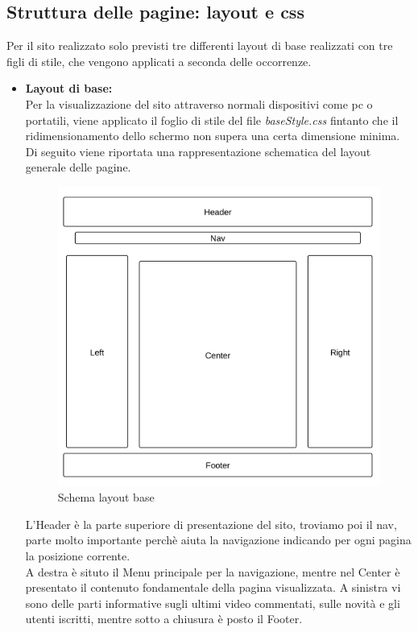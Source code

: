 \subsection{Struttura delle pagine: layout e css}
Per il sito realizzato solo previsti tre differenti layout di base realizzati con tre figli di stile, che vengono applicati a seconda delle occorrenze.

\begin{itemize}

\item \textbf{Layout di base:}\\
Per la visualizzazione del sito attraverso normali dispositivi come pc o portatili, viene applicato il foglio di stile del file \textit{baseStyle.css} fintanto che il ridimensionamento dello schermo non supera una certa dimensione minima.\\
Di seguito viene riportata una rappresentazione schematica del layout generale delle pagine.

\begin{center}
\begin{figure}[H]
\centering
\includegraphics[scale=0.6]{images/baseLayout.png}
\caption{Schema layout base}
\end{figure}
\end{center}

L'Header è la parte superiore di presentazione del sito, troviamo poi il nav, parte molto importante perchè aiuta la navigazione indicando per ogni pagina la posizione corrente.\\
A destra è situto il Menu principale per la navigazione, mentre nel Center è presentato il contenuto fondamentale della pagina visualizzata. A sinistra vi sono delle parti informative sugli ultimi video commentati, sulle novità e gli utenti iscritti, mentre sotto a chiusura è posto il Footer.



\end{itemize}
